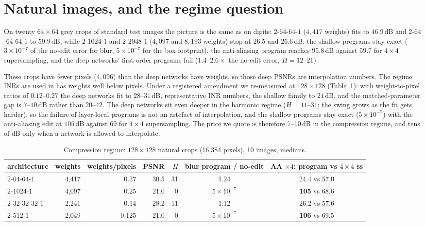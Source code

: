 \documentclass[11pt]{article}
\begin{document}
\section{Natural images, and the regime question}
\label{sec:natural}
On twenty $64\times64$ grey crops of standard test images the picture is the same as on digits: $2$-$64$-$64$-$1$ ($4{,}417$ weights) fits to $46.9$\,dB and $2$-$64$-$64$-$64$-$1$ to $59.9$\,dB, while $2$-$1024$-$1$ and $2$-$2048$-$1$ ($4{,}097$ and $8{,}193$ weights) stop at $26.5$ and $26.6$\,dB; the shallow programs stay exact ($3\times10^{-7}$ of the no-edit error for blur, $5\times10^{-7}$ for the box footprint), the anti-aliasing program reaches $95.8$\,dB against $59.7$ for $4\times4$ supersampling, and the deep networks' first-order programs fail ($1.4$--$2.6\times$ the no-edit error, $H=12$--$21$).

These crops have fewer pixels ($4{,}096$) than the deep networks have weights, so those deep PSNRs are interpolation numbers. The regime INRs are used in has weights well below pixels. Under a registered amendment we re-measured at $128\times128$ (Table~\ref{tab:comp}): with weight-to-pixel ratios of $0.12$--$0.27$ the deep networks fit to $28$--$31$\,dB, representative INR numbers, the shallow family to $21$\,dB, and the matched-parameter gap is $7$--$10$\,dB rather than $20$--$42$. The deep networks sit even deeper in the harmonic regime ($H=11$--$31$; the swing grows as the fit gets harder), so the failure of layer-local programs is not an artefact of interpolation, and the shallow programs stay exact ($5\times10^{-7}$) with the anti-aliasing edit at $105$\,dB against $69$ for $4\times4$ supersampling. The price we quote is therefore 7--10\,dB in the compression regime, and tens of dB only when a network is allowed to interpolate.

\begin{table}[t]\centering\small
\caption{Compression regime: $128\times128$ natural crops (16,384 pixels), 10 images, medians.}
\label{tab:comp}
\begin{tabular}{lrrrrcc}\toprule
architecture & weights & weights/pixels & PSNR & $H$ & blur program / no-edit & AA $\times4$: program vs $4\times4$ ss\\\midrule
$2$-$64$-$64$-$1$ & 4,417 & 0.27 & 30.5 & 31 & 1.24 & 24.4 vs 57.0\\
$2$-$1024$-$1$ & 4,097 & 0.25 & 21.0 & 0 & $5\times10^{-7}$ & \textbf{105} vs 68.6\\
$2$-$32$-$32$-$32$-$1$ & 2,241 & 0.14 & 28.2 & 11 & 1.12 & 26.2 vs 57.6\\
$2$-$512$-$1$ & 2,049 & 0.125 & 21.0 & 0 & $5\times10^{-7}$ & \textbf{106} vs 69.5\\\bottomrule
\end{tabular}
\end{table}
\end{document}
